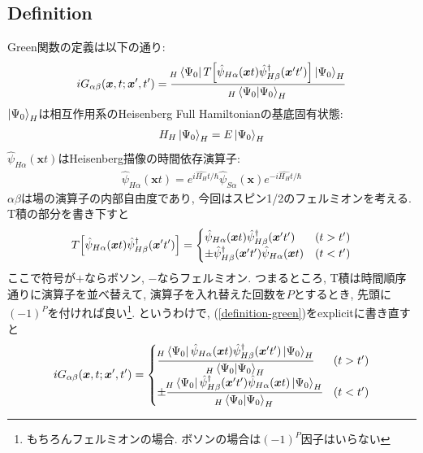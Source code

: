 \documentclass[10.5pt,a4paper]{jreport}
\begin{document}
\subsection{Definition}
Green関数の定義は以下の通り:
\begin{eqnarray}
  iG_{\alpha\beta}(\bm{x}, t;\bm{x}', t') = \frac{\!_H\bra{\Psi_0}T\qty[\hat{\psi}_{H\alpha}(\bm{x}t)\hat{\psi}_{H\beta}^\dagger(\bm{x}'t')]\ket{\Psi_0}_H}{\!_H\bra{\Psi_0}\ket{\Psi_0}_H}\label{definition-green}
\end{eqnarray}
$\ket{\Psi_0}_H$は相互作用系のHeisenberg Full Hamiltonianの基底固有状態:
\begin{eqnarray}
  H_H\ket{\Psi_0}_H = E\ket{\Psi_0}_H 
\end{eqnarray}
$\hat{\psi}_{H\alpha}(\bm{x}t)$はHeisenberg描像の時間依存演算子:
\begin{eqnarray}
  \hat{\psi}_{H\alpha}(\bm{x}t) = e^{i\hat{H_H}t/\hbar}\hat{\psi}_{S\alpha}(\bm{x})e^{-i\hat{H_H}t/\hbar}
\end{eqnarray}
$\alpha\beta$は場の演算子の内部自由度であり, 今回はスピン1/2のフェルミオンを考える. T積の部分を書き下すと
\begin{eqnarray}
  T\qty[\hat{\psi}_{H\alpha}(\bm{x}t)\hat{\psi}_{H\beta}^\dagger(\bm{x}'t')] =
  \begin{cases}
    \hat{\psi}_{H\alpha}(\bm{x}t)\hat{\psi}_{H\beta}^\dagger(\bm{x}'t') & (t > t')\\
    \pm\hat{\psi}_{H\beta}^\dagger(\bm{x}'t')\hat{\psi}_{H\alpha}(\bm{x}t) & (t < t')
  \end{cases}
\end{eqnarray}
ここで符号が$+$ならボソン, $-$ならフェルミオン. つまるところ, T積は時間順序通りに演算子を並べ替えて, 演算子を入れ替えた回数を$P$とするとき, 先頭に$(-1)^P$を付ければ良い\footnote{もちろんフェルミオンの場合. ボソンの場合は$(-1)^P$因子はいらない}. というわけで, (\ref{definition-green})をexplicitに書き直すと
\begin{eqnarray}
  iG_{\alpha\beta}(\bm{x}, t;\bm{x}', t') =
  \begin{cases}
    \cfrac{\!_H\bra{\Psi_0}\hat{\psi}_{H\alpha}(\bm{x}t)\hat{\psi}_{H\beta}^\dagger(\bm{x}'t')\ket{\Psi_0}_H}{\!_H\bra{\Psi_0}\ket{\Psi_0}_H} & (t > t')\\
    \pm\cfrac{\!_H\bra{\Psi_0}\hat{\psi}_{H\beta}^\dagger(\bm{x}'t')\hat{\psi}_{H\alpha}(\bm{x}t)\ket{\Psi_0}_H}{\!_H\bra{\Psi_0}\ket{\Psi_0}_H} & (t < t')
  \end{cases}
    \label{definition-green2}
\end{eqnarray}
\end{document}
